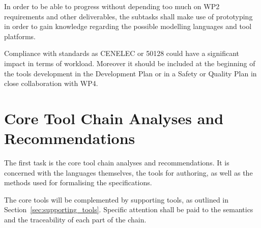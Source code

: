 \documentclass{template/openetcs_article}
\begin{document}
In order to be able to progress without depending too much on WP2 requirements and other deliverables, the subtasks shall make use of prototyping in order to gain knowledge regarding the possible modelling languages and tool platforms.  

Compliance with standards as CENELEC or 50128 could have a
significant impact in terms of workload. Moreover it should be included at the
beginning of the tools development in the Development Plan or in a Safety or
Quality Plan in close collaboration with WP4.

\section{Core Tool Chain Analyses and
           Recommendations}
\label{sec:core_tool}

The first task is the core tool chain analyses and recommendations. It
is concerned with the languages themselves, the tools for authoring, as well as the methods used for formalising the specifications.

The core tools will be complemented by supporting tools, as outlined in Section~\ref{sec:supporting_tools}.
Specific attention shall be paid to the semantics and the traceability of each part of the chain.



\end{document}
